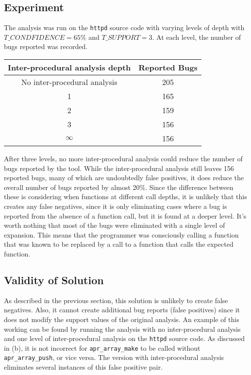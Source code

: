 \documentclass[12pt]{article}
\begin{document}
\subsection*{Experiment}
The analysis was run on the \texttt{httpd} source code with varying levels of depth with $T\_CONDFIDENCE=65\%$ and $T\_SUPPORT=3$. At each level, the number of bugs reported was recorded.
\begin{center}
\begin{tabular}{c|c}
\textbf{Inter-procedural analysis depth} & \textbf{Reported Bugs}\\\hline
No inter-procedural analysis & 205\\
1 & 165\\
2 & 159\\
3 & 156\\
$\infty$ & 156\\
\end{tabular}
\end{center}
After three levels, no more inter-procedural analysis could reduce the number of bugs reported by the tool. While the inter-procedural analysis still leaves 156 reported bugs, many of which are undoubtedly false positives, it does reduce the overall number of bugs reported by almost 20\%. Since the difference between these is considering when functions at different call depths, it is unlikely that this creates any false negatives, since it is only eliminating cases where a bug is reported from the absence of a function call, but it is found at a deeper level. It's worth nothing that most of the bugs were eliminated with a single level of expansion. This means that the programmer was consciously calling a function that was known to be replaced by a call to a function that calls the expected function.
\subsection*{Validity of Solution}
As described in the previous section, this solution is unlikely to create false negatives. Also, it cannot create additional bug reports (false positives) since it does not modify the support values of the original analysis. An example of this working can be found by running the analysis with no inter-procedural analysis and one level of inter-procedural analysis on the \texttt{httpd} source code. As discussed in (b), it is not incorrect for \texttt{apr\_array\_make} to be called without \texttt{apr\_array\_push}, or vice versa. The version with inter-procedural analysis eliminates several instances of this false positive pair.
\end{document}
